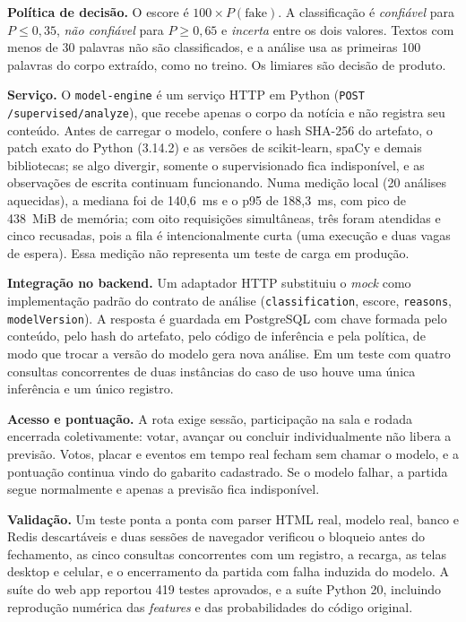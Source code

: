 \documentclass[brazilian,11pt,a4paper]{article}
\begin{document}
\textbf{Política de decisão.} O escore é $100\times P(\text{fake})$. A classificação é \emph{confiável} para $P\le0{,}35$, \emph{não confiável} para $P\ge0{,}65$ e \emph{incerta} entre os dois valores. Textos com menos de 30 palavras não são classificados, e a análise usa as primeiras 100 palavras do corpo extraído, como no treino. Os limiares são decisão de produto.

\textbf{Serviço.} O \texttt{model-engine} é um serviço HTTP em Python (\texttt{POST /supervised/analyze}), que recebe apenas o corpo da notícia e não registra seu conteúdo. Antes de carregar o modelo, confere o hash SHA-256 do artefato, o patch exato do Python (3.14.2) e as versões de scikit-learn, spaCy e demais bibliotecas; se algo divergir, somente o supervisionado fica indisponível, e as observações de escrita continuam funcionando. Numa medição local (20 análises aquecidas), a mediana foi de 140,6~ms e o p95 de 188,3~ms, com pico de 438~MiB de memória; com oito requisições simultâneas, três foram atendidas e cinco recusadas, pois a fila é intencionalmente curta (uma execução e duas vagas de espera). Essa medição não representa um teste de carga em produção.

\textbf{Integração no backend.} Um adaptador HTTP substituiu o \textit{mock} como implementação padrão do contrato de análise (\texttt{classification}, escore, \texttt{reasons}, \texttt{modelVersion}). A resposta é guardada em PostgreSQL com chave formada pelo conteúdo, pelo hash do artefato, pelo código de inferência e pela política, de modo que trocar a versão do modelo gera nova análise. Em um teste com quatro consultas concorrentes de duas instâncias do caso de uso houve uma única inferência e um único registro.

\textbf{Acesso e pontuação.} A rota  exige sessão, participação na sala e rodada encerrada coletivamente: votar, avançar ou concluir individualmente não libera a previsão. Votos, placar e eventos em tempo real fecham sem chamar o modelo, e a pontuação continua vindo do gabarito cadastrado. Se o modelo falhar, a partida segue normalmente e apenas a previsão fica indisponível.

\textbf{Validação.} Um teste ponta a ponta com parser HTML real, modelo real, banco e Redis descartáveis e duas sessões de navegador verificou o bloqueio antes do fechamento, as cinco consultas concorrentes com um registro, a recarga, as telas desktop e celular, e o encerramento da partida com falha induzida do modelo. A suíte do web app reportou 419 testes aprovados, e a suíte Python 20, incluindo reprodução numérica das \textit{features} e das probabilidades do código original.
\end{document}
